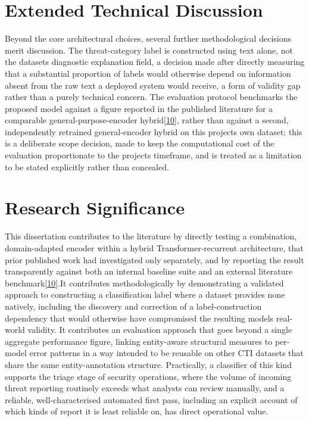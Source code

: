 \documentclass[12pt,a4paper]{report}
\begin{document}
\protect{}\label{_Toc239502930}{}\section{Extended
Technical Discussion}

Beyond the core architectural choices, several further methodological
decisions merit discussion. The threat-category label is constructed
using text alone, not the dataset\textquotesingle s diagnostic
explanation field, a decision made after directly measuring that a
substantial proportion of labels would otherwise depend on information
absent from the raw text a deployed system would receive, a form of
validity gap rather than a purely technical concern. The evaluation
protocol benchmarks the proposed model against a figure reported in the
published literature for a comparable general-purpose-encoder
hybrid{[}\href{file:///D:/Downloads/final-report-formatted-v4(1).docx\#ref_10}{\ul{10}}{]},
rather than against a second, independently retrained general-encoder
hybrid on this project\textquotesingle s own dataset; this is a
deliberate scope decision, made to keep the computational cost of the
evaluation proportionate to the project\textquotesingle s timeframe, and
is treated as a limitation to be stated explicitly rather than
concealed.

\protect{}\label{_Toc239502931}{}\section{Research
Significance}

This dissertation contributes to the literature by directly testing a
combination, domain-adapted encoder within a hybrid
Transformer-recurrent architecture, that prior published work had
investigated only separately, and by reporting the result transparently
against both an internal baseline suite and an external literature
benchmark{[}\href{file:///D:/Downloads/final-report-formatted-v4(1).docx\#ref_10}{\ul{10}}{]}.It
contributes methodologically by demonstrating a validated approach to
constructing a classification label where a dataset provides none
natively, including the discovery and correction of a label-construction
dependency that would otherwise have compromised the resulting
model\textquotesingle s real-world validity. It contributes an
evaluation approach that goes beyond a single aggregate performance
figure, linking entity-aware structural measures to per-model error
patterns in a way intended to be reusable on other CTI datasets that
share the same entity-annotation structure. Practically, a classifier of
this kind supports the triage stage of security operations, where the
volume of incoming threat reporting routinely exceeds what analysts can
review manually, and a reliable, well-characterised automated first
pass, including an explicit account of which kinds of report it is least
reliable on, has direct operational value.
\end{document}

